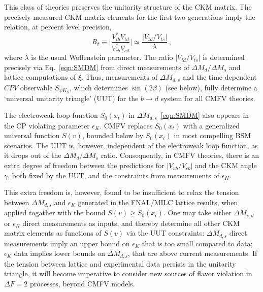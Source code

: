 This class of theories preserves the unitarity structure of the CKM matrix. The precisely measured CKM matrix elements for the first two generations imply the relation, at percent level precision,
\begin{equation}
	R_t \equiv \bigg|\frac{V_{tb}^*V_{td}}{V_{cb}^*V_{cd}}\bigg| \simeq \frac{|V_{td}/V_{ts}|}{\lambda}\,,
\end{equation}
where $\lambda$ is the usual Wolfenstein parameter. The ratio $|V_{td}/V_{ts}|$ is determined precisely via Eq.~\eqref{eqn:SMDM} from direct measurements of $\Delta M_d/ \Delta M_s$ and lattice computations of $\xi$. Thus, measurements of $\Delta M_{d,s}$ and the time-dependent $CPV$ observable $S_{\psi K_S}$, which determines $\sin(2\beta)$ (see below), fully determine a `universal unitarity triangle' (UUT) for the $b \to d$ system for all CMFV theories. 

The electroweak loop function $S_0(x_t)$ in $\Delta M_{d,s}$~\eqref{eqn:SMDM} also appears in the CP violating parameter $\epsilon_K$. CMFV replaces $S_0(x_t)$ with a generalized universal function $S(v)$, bounded below by $S_0(x_t)$ in most compelling BSM scenarios. The UUT is, however, independent of the electroweak loop function, as it drops out of the $\Delta M_{d}/\Delta M_s$ ratio. Consequently, in CMFV theories, there is an extra degree of freedom between the predictions for $|V_{ub}/V_{cb}|$ and the CKM angle $\gamma$, both fixed by the UUT, and the constraints from measurements of $\epsilon_K$. 

This extra freedom is, however, found to be insufficient to relax the tension between $\Delta M_{d,s}$ and $\epsilon_K$ generated in the FNAL/MILC lattice results, when applied togather with the bound $S(v) \ge S_0(x_t)$. One may take either $\Delta M_{s,d}$ or $\epsilon_K$ direct measurements as inputs, and thereby determine all other CKM matrix elements as functions of $S(v)$ via the UUT constraints: $\Delta M_{d,s}$ direct measurements imply an upper bound on $\epsilon_K$ that is too small compared to data; $\epsilon_K$ data implies lower bounds on $\Delta M_{d,s}$, that are above current measurements. If the tension between lattice and experimental data persists in the unitarity triangle, it will become imperative to consider new sources of flavor violation in $\Delta F = 2$ processes, beyond CMFV models.

